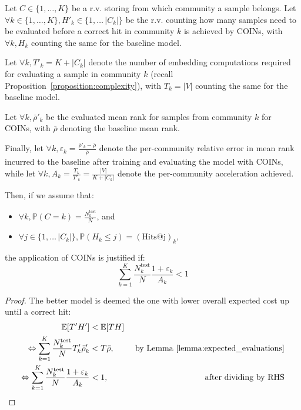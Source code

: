 \begin{proposition}
    \label{proposition:condition_applicability}
    Let $C \in \{1,\dots,K\}$ be a r.v. storing from which community a sample belongs. Let $\forall k \in \{1,\dots,K\}, H'_k \in \{1,\dots\,|C_k|\}$ be the r.v. counting how many samples need to be evaluated before a correct hit in community $k$ is achieved by COINs, with $\forall k, H_k$ counting the same for the baseline model. 
    
    Let $\forall k, T'_k=K+|C_k|$ denote the number of embedding computations required for evaluating a sample in community $k$ (recall Proposition~\ref{proposition:complexity}), with $T_k=|V|$ counting the same for the baseline model. 
    
    Let $\forall k, \bar{\rho}'_k$ be the evaluated mean rank for samples from community $k$ for COINs, with $\bar{\rho}$ denoting the baseline mean rank. 
    
    Finally, let $\forall k, \varepsilon_k = \frac{\bar{\rho}'_k - \bar{\rho}}{\bar{\rho}}$ denote the per-community relative error in mean rank incurred to the baseline after training and evaluating the model with COINs, while let $\forall k, A_k=\frac{T_k}{T'_k}=\frac{|V|}{K+|C_k|}$ denote the per-community acceleration achieved. 
    
    Then, if we assume that:
    \begin{itemize}
        \item $\forall k, \mathbb{P}(C=k)=\frac{N_k^{\text{test}}}{N}$, and
        \item $\forall j \in \{1,\dots\,|C_k|\}, \mathbb{P}(H_k \leq j)=(\text{Hits@j})_k$,
    \end{itemize}
     the application of COINs is justified if:
    \begin{equation}
        \label{eq:condition_applicability}
        \sum_{k=1}^{K}{\frac{N_k^{\text{test}}}{N} \frac{1 + \varepsilon_k}{A_k}} < 1
    \end{equation}
\end{proposition}
\begin{proof}
The better model is deemed the one with lower overall expected cost up until a correct hit:
    \begin{align*}
        \mathbb{E}[T' H'] &< \mathbb{E}[T H] \\
        \Leftrightarrow \sum_{k=1}^{K}{\frac{N_k^{\text{test}}}{N} T'_k \bar{\rho}'_k} &< T \bar{\rho}, & \text{ by Lemma~\ref{lemma:expected_evaluations}} \\
        \Leftrightarrow \sum_{k=1}^{K}{\frac{N_k^{\text{test}}}{N} \frac{1 + \varepsilon_k}{A_k}} &< 1, & \text{ after dividing by RHS}
    \end{align*}
\end{proof}%

